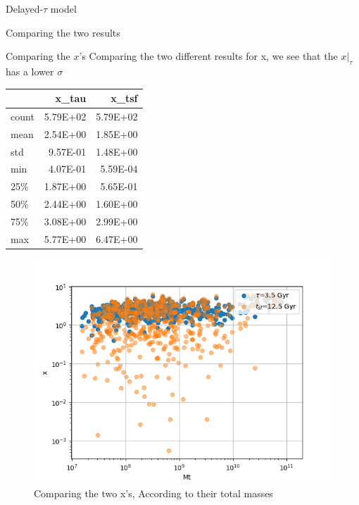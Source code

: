 \documentclass[presentation]{beamer}
\begin{document}
\begin{frame}[label={sec:org05089e9}]{Delayed-\(\tau\) model}
\begin{block}{Comparing the two results}
\begin{block}{Comparing the \(x\)'s}
Comparing the two different results for x, we see that the \(x|_\tau\) has a lower \(\sigma\)


\begin{table}[hc]
\centering
\begin{tabular}{lrr}
\toprule
{} &    x\_tau &    x\_tsf \\
\midrule
count & 5.79E+02 & 5.79E+02 \\
mean  & 2.54E+00 & 1.85E+00 \\
std   & 9.57E-01 & 1.48E+00 \\
min   & 4.07E-01 & 5.59E-04 \\
25\%   & 1.87E+00 & 5.65E-01 \\
50\%   & 2.44E+00 & 1.60E+00 \\
75\%   & 3.08E+00 & 2.99E+00 \\
max   & 5.77E+00 & 6.47E+00 \\
\bottomrule
\end{tabular}
\end{table}


\begin{figure}[!htpb]
\centering
\includegraphics[width=.9\linewidth]{./figs/Comparing_the_x_Mt.png}
\caption{\label{fig:Comparing the two x's, According to their total masses}Comparing the two x's, According to their total masses}
\end{figure}


\end{block}
\end{block}
\end{frame}
\end{document}
